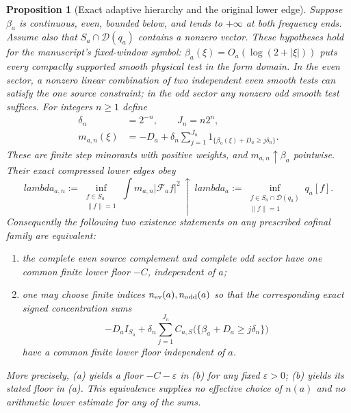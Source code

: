 \documentclass[11pt]{article}
\def\lambda{lambda}%
\newtheorem{proposition}[theorem]{Proposition}
\theoremstyle{remark}
\begin{document}
\begin{proposition}[Exact adaptive hierarchy and the original lower edge]
\label{ns43-conc-prop-adaptive}
Suppose $\beta_a$ is continuous, even, bounded below, and tends to
$+\infty$ at both frequency ends. Assume also that
$S_a\cap\mathcal D(q_a)$ contains a nonzero vector.
These hypotheses hold for the manuscript's fixed-window symbol:
$\beta_a(\xi)=O_a(\log(2+|\xi|))$ puts every compactly supported
smooth physical test in the form domain. In the even sector, a
nonzero linear combination of two independent even smooth tests
can satisfy the one source constraint; in the odd sector any
nonzero odd smooth test suffices. For integers $n\ge1$ define
\begin{align*}
 \delta_n&=2^{-n},\qquad J_n=n2^n,\\
 m_{a,n}(\xi)&=-D_a+
 \delta_n\sum_{j=1}^{J_n}
       1_{\{\beta_a(\xi)+D_a\ge j\delta_n\}}.
\end{align*}
These are finite step minorants with positive weights, and
$m_{a,n}\uparrow\beta_a$ pointwise. Their exact compressed lower
edges obey
\begin{equation}\label{ns43-conc-eq-edge-limit}
 \lambda_{a,n}:=\inf_{\substack{f\in S_a\\\|f\|=1}}
   \int m_{a,n}|\mathcal F_af|^2
 \ \uparrow\
 \lambda_a:=\inf_{\substack{f\in S_a\cap\mathcal D(q_a)\\\|f\|=1}}
   q_a[f].
\end{equation}
Consequently the following two existence statements on any prescribed
cofinal family are equivalent:
\begin{enumerate}[label=(\alph*)]
\item the complete even source complement and complete odd sector
have one common finite lower floor $-C$, independent of $a$;
\item one may choose finite indices $n_{\rm ev}(a),n_{\rm odd}(a)$
so that the corresponding exact signed concentration sums
\[
 -D_a I_{S_a}+\delta_n\sum_{j=1}^{J_n}
 C_{a,S}\bigl(\{\beta_a+D_a\ge j\delta_n\}\bigr)
\]
have a common finite lower floor independent of $a$.
\end{enumerate}
More precisely, (a) yields a floor $-C-\varepsilon$ in (b) for any
fixed $\varepsilon>0$; (b) yields its stated floor in (a).
This equivalence supplies no effective choice of $n(a)$ and no
arithmetic lower estimate for any of the sums.
\end{proposition}
\end{document}
